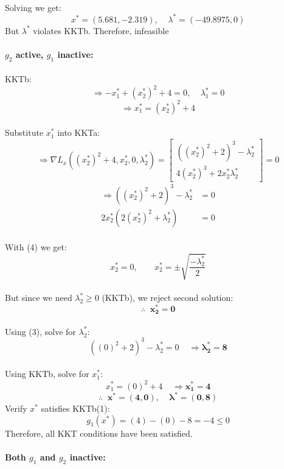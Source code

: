 \documentclass{article}
\begin{document}
\\
\hspace*{20mm}
Solving we get:
$$x^*=(5.681, -2.319),\;\;\;\;\lambda^*=(-49.8975,0)$$
\hspace*{20mm}
But $\lambda^*$ violates KKTb. Therefore, infeasible\\
\\
\hspace*{10mm}
\textbf{$g_2$ active, $g_1$ inactive:}\\
\\
\hspace*{20mm}
KKTb:
$$\Rightarrow -x_1^*+(x_2^*)^2+4= 0,\;\;\;\;\lambda_1^*=0$$
$$\Rightarrow x_1^*=(x_2^*)^2+4$$
\\
\hspace*{20mm}
Substitute $x_1^*$ into KKTa:
$$\Rightarrow \nabla L_x((x_2^*)^2+4,x_2^*,0,\lambda_2^*) = 
\begin{bmatrix}
((x_2^*)^2+2)^3-\lambda_2^*\\
4(x_2^*)^3+2x_2^*\lambda_2^*
\end{bmatrix}
=0
$$
\begin{align}
\Rightarrow((x_2^*)^2+2)^3-\lambda_2^*&=0\\
2x_2^*(2(x_2^*)^2+\lambda_2^*)&=0
\end{align}
\\
\hspace*{20mm}
With (4) we get:
$$x_2^*=0,\;\;\;\;\;\;\;x_2^*=\pm\sqrt{\frac{-\lambda_2^*}{2}}$$
\\
\hspace*{20mm}
But since we need $\lambda_2^*\geq0$ (KKTb), we reject second solution:
$$\therefore\;\;\mathbf{x_2^*=0}$$
\\
\hspace*{20mm}
Using (3), solve for $\lambda_2^*$:
$$((0)^2+2)^3-\lambda_2^*=0\;\;\;\;\Rightarrow\mathbf{\lambda_2^*=8}$$
\\
\hspace*{20mm}
Using KKTb, solve for $x_1^*$:
$$x_1^*=(0)^2+4\;\;\;\;\Rightarrow\mathbf{x_1^*=4}$$
$$\therefore\;\;\mathbf{x^*=(4,0)},\;\;\;\;\mathbf{\lambda^*=(0,8)}$$
\hspace*{20mm}
Verify $x^*$ satisfies KKTb(1):
$$g_1(x^*)=(4)-(0)-8=-4\leq0$$
\hspace*{20mm}
Therefore, all KKT conditions have been satisfied.\\
\\
\hspace*{10mm}
\textbf{Both $g_1$ and $g_2$ inactive:}\\
\end{document}
